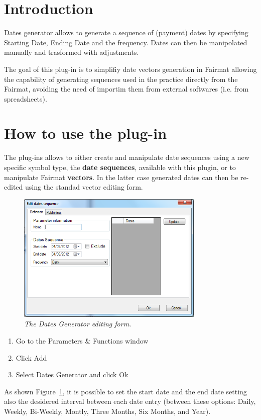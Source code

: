 \newcommand{\pluginName}{Dates Generator}
\newcommand{\pluginVersion}{1.0}





\PluginTitle{\pluginName}{\pluginVersion}

\section{Introduction}
Dates generator allows to generate a sequence of (payment) dates by specifying Starting Date, Ending Date and the frequency. Dates can then be manipolated manually and trasformed with adjustments.

The goal of this plug-in is to simplifiy date vectors generation in Fairmat allowing the capability of generating sequences used in the practice directly from the Fairmat, avoiding the 
need of importim them from external softwares (i.e. from spreadsheets).

\section{How to use the plug-in}
The plug-ins allows to either create and manipulate date sequences using a new specific symbol type, the \textbf{date sequences}, available with this plugin, or to manipulate Fairmat \textbf{vectors}. In the latter case generated dates can then be re-edited using the standad vector editing form.

\begin{figure}[htbp]
\includegraphics[width=0.8\textwidth]{DG_img}
\centering
\caption{\small{\emph{The Dates Generator editing form.}}}
\label{fig:DG}
\end{figure}

\begin{enumerate}
\item Go to the Parameters \& Functions window
\item Click Add
\item Select Dates Generator and click Ok
\end{enumerate}
As shown Figure~\ref{fig:DG}, it is possible to set the start date and the end date setting also the desidered interval between each date entry (between these options: Daily, Weekly, Bi-Weekly, Montly, Three Months, Six Months, and Year).


